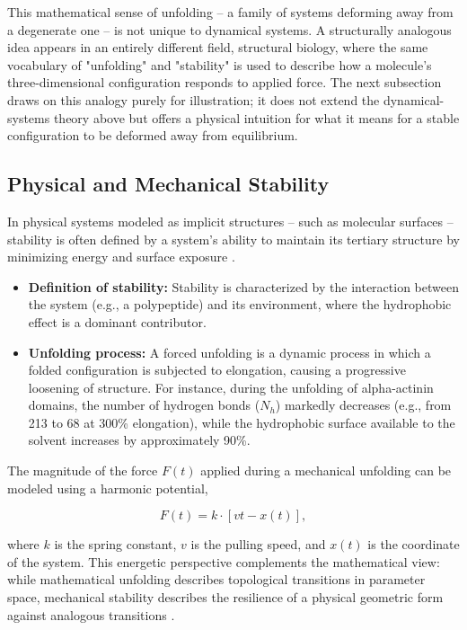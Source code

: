 \documentclass[12pt, a4paper, oneside]{book}
\theoremstyle{plain}
\theoremstyle{definition}
\theoremstyle{remark}
\theoremstyle{definition}
\begin{document}
This mathematical sense of unfolding -- a family of systems deforming away from a degenerate one -- is not unique to dynamical systems. A structurally analogous idea appears in an entirely different field, structural biology, where the same vocabulary of "unfolding" and "stability" is used to describe how a molecule's three-dimensional configuration responds to applied force. The next subsection draws on this analogy purely for illustration; it does not extend the dynamical-systems theory above but offers a physical intuition for what it means for a stable configuration to be deformed away from equilibrium.

\subsection{Physical and Mechanical Stability}

In physical systems modeled as implicit structures -- such as molecular surfaces -- stability is often defined by a system's ability to maintain its tertiary structure by minimizing energy and surface exposure \cite{soncini2007mechanical}.

\begin{itemize}
    \item \textbf{Definition of stability:} Stability is characterized by the interaction between the system (e.g., a polypeptide) and its environment, where the hydrophobic effect is a dominant contributor.
    \item \textbf{Unfolding process:} A forced unfolding is a dynamic process in which a folded configuration is subjected to elongation, causing a progressive loosening of structure. For instance, during the unfolding of alpha-actinin domains, the number of hydrogen bonds ($N_h$) markedly decreases (e.g., from 213 to 68 at 300\% elongation), while the hydrophobic surface available to the solvent increases by approximately 90\%.
\end{itemize}

The magnitude of the force $F(t)$ applied during a mechanical unfolding can be modeled using a harmonic potential,

\begin{equation}
    F(t) = k \cdot [vt - x(t)],
\end{equation}

where $k$ is the spring constant, $v$ is the pulling speed, and $x(t)$ is the coordinate of the system. This energetic perspective complements the mathematical view: while mathematical unfolding describes topological transitions in parameter space, mechanical stability describes the resilience of a physical geometric form against analogous transitions \cite{ibanez2005shil, soncini2007mechanical}.
\end{document}
